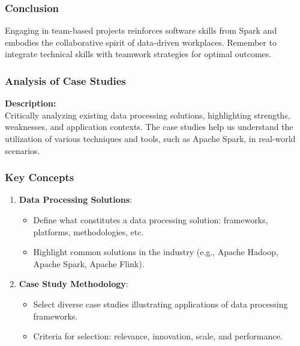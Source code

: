 \documentclass[aspectratio=169]{beamer}
\begin{document}
\begin{frame}[fragile]
  \frametitle{Conclusion}
  Engaging in team-based projects reinforces software skills from Spark and embodies the collaborative spirit of data-driven workplaces. Remember to integrate technical skills with teamwork strategies for optimal outcomes.
\end{frame}

\begin{frame}[fragile]
    \frametitle{Analysis of Case Studies}
    \textbf{Description:} \\
    Critically analyzing existing data processing solutions, highlighting strengths, weaknesses, and application contexts. 
    \newline
    The case studies help us understand the utilization of various techniques and tools, such as Apache Spark, in real-world scenarios. 
\end{frame}

\begin{frame}[fragile]
    \frametitle{Key Concepts}
    \begin{enumerate}
        \item \textbf{Data Processing Solutions}:
        \begin{itemize}
            \item Define what constitutes a data processing solution: frameworks, platforms, methodologies, etc.
            \item Highlight common solutions in the industry (e.g., Apache Hadoop, Apache Spark, Apache Flink).
        \end{itemize}
        
        \item \textbf{Case Study Methodology}:
        \begin{itemize}
            \item Select diverse case studies illustrating applications of data processing frameworks.
            \item Criteria for selection: relevance, innovation, scale, and performance.
        \end{itemize}
    \end{enumerate}
\end{frame}
\end{document}
